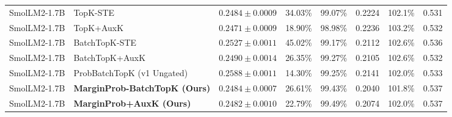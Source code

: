 \documentclass[10pt]{article}
\begin{document}
\begin{table}[t]
{\begin{tabular}{llrrrrrr}
    SmolLM2-1.7B & TopK-STE \citep{gao2024scaling} & $0.2484\pm0.0009$ & 34.03\% & 99.07\% & 0.2224 & 102.1\% & 0.531 \\
    SmolLM2-1.7B & TopK+AuxK \citep{gao2024scaling} & $0.2471\pm0.0009$ & 18.90\% & 98.98\% & 0.2236 & 103.2\% & 0.532 \\
    SmolLM2-1.7B & BatchTopK-STE \citep{bussmann2024batchtopk} & $0.2527\pm0.0011$ & 45.02\% & 99.17\% & 0.2112 & 102.6\% & 0.536 \\
    SmolLM2-1.7B & BatchTopK+AuxK \citep{bussmann2024batchtopk} & $0.2490\pm0.0014$ & 26.35\% & 99.27\% & 0.2105 & 102.6\% & 0.532 \\
    SmolLM2-1.7B & ProbBatchTopK (v1 Ungated) & $0.2588\pm0.0011$ & 14.30\% & 99.25\% & 0.2141 & 102.0\% & 0.533 \\
    SmolLM2-1.7B & \textbf{MarginProb-BatchTopK (Ours)} & $0.2484\pm0.0007$ & 26.61\% & 99.43\% & 0.2040 & 101.8\% & 0.537 \\
    SmolLM2-1.7B & \textbf{MarginProb+AuxK (Ours)} & $0.2482\pm0.0010$ & 22.79\% & 99.49\% & 0.2074 & 102.0\% & 0.537 \\
    \bottomrule
  \end{tabular}}
\end{table}
\end{document}
